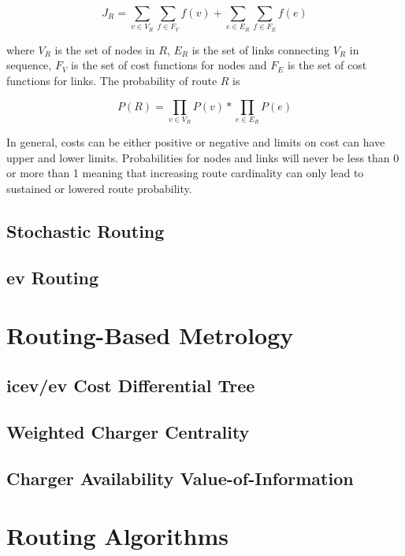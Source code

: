\documentclass[12pt]{article}
\begin{document}
\begin{equation}
	J_R = \sum_{v\in V_R}\sum_{f\in F_V} f(v) + \sum_{e\in E_R}\sum_{f\in F_E} f(e)
\end{equation}

where $V_R$ is the set of nodes in $R$, $E_R$ is the set of links connecting $V_R$ in sequence, $F_V$ is the set of cost functions for nodes and $F_E$ is the set of cost functions for links. The probability of route $R$ is

\begin{equation}
	P(R) = \prod_{v\in V_R}P(v) * \prod_{e\in E_R}P(e)
\end{equation}

In general, costs can be either positive or negative and limits on cost can have upper and lower limits. Probabilities for nodes and links will never be less than 0 or more than 1 meaning that increasing route cardinality can only lead to sustained or lowered route probability.

\subsection*{Stochastic Routing}

\subsection*{\gls{ev} Routing}

\section*{Routing-Based Metrology}

\subsection*{\gls{icev}/\gls{ev} Cost Differential Tree}

\subsection*{Weighted Charger Centrality}

\subsection*{Charger Availability Value-of-Information}


\appendix
\section*{Routing Algorithms}
\end{document}
